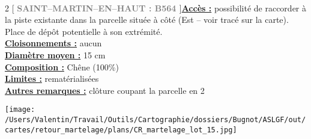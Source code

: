 \documentclass[a4paper,openany]{book}\usepackage[]{graphicx}\usepackage[]{color}
\begin{document}
\\\begin{multicols}{2}
[
\textbf{\textcolor{gray}{
\large SAINT--MARTIN--EN--HAUT : B564
}}
]\noindent\textbf{\underline{Accès :}} possibilité de raccorder à la piste existante dans la parcelle située à côté (Est -- voir tracé sur la carte). Place de dépôt potentielle à son extrémité. \vspace{0.1cm} \\\noindent\textbf{\underline{Cloisonnements :}} aucun\vspace{0.1cm} \\\noindent\textbf{\underline{Diamètre moyen :}} 15 cm\vspace{0.1cm} \\\noindent\textbf{\underline{Composition :}} Chêne (100\%)\vspace{0.1cm} \\\noindent\textbf{\underline{Limites :}} rematérialisées\vspace{0.1cm} \\\noindent\textbf{\underline{Autres remarques :}} clôture coupant la parcelle en 2\vspace{0.1cm} \\\end{multicols}\begin{center}
\texttt{[image: /Users/Valentin/Travail/Outils/Cartographie/dossiers/Bugnot/ASLGF/out/cartes/retour\_martelage/plans/CR\_martelage\_lot\_15.jpg]}
\end{center}\newpage\noindent
\end{document}
